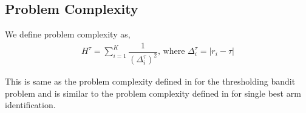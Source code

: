 

\subsection{Problem Complexity}

We define problem complexity as,
\begin{align*}
H^{\tau} = \sum_{i=1}^{K}\dfrac{1}{(\Delta_{i}^{\tau})^{2}} \text{, where } \Delta_{i}^{\tau}=|r_{i}-\tau|
\end{align*}

This is same as the problem complexity defined in \cite{locatelli2016optimal} for the thresholding bandit problem and is similar to the problem complexity defined in \cite{audibert2010best} for single best arm identification.

%
%
%
%
%
%


